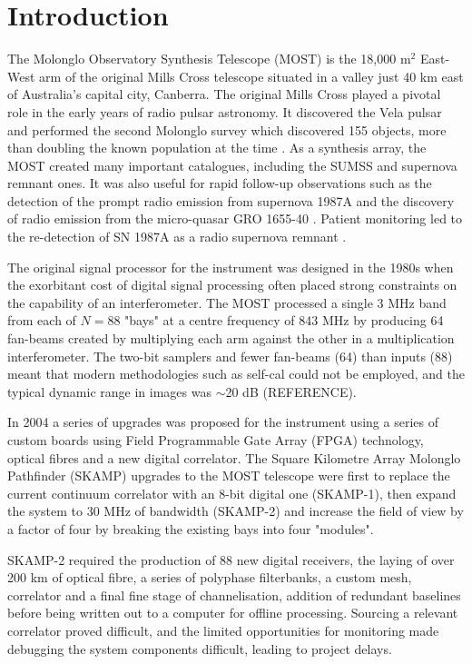 \section{Introduction} 
The Molonglo Observatory Synthesis Telescope (MOST) is the 18,000 m$^2$ East-West arm of the original Mills Cross telescope situated in a valley just 40 km east of Australia's capital city, Canberra. The original Mills Cross played a pivotal role in the early years of radio pulsar astronomy. It discovered the Vela pulsar \cite{LARGE_1968} and performed the second Molonglo survey which discovered 155 objects, more than doubling the known population at the time \cite{Manchester_1978}. As a synthesis array, the MOST created many important catalogues, including the SUMSS \cite{Bock_1999,Mauch_2003} and supernova remnant \cite{Whiteoak_1996} ones. It was also useful for rapid follow-up observations such as the detection of the prompt radio emission from supernova 1987A \cite{Turtle_1987} and the discovery of radio emission from the micro-quasar GRO 1655-40 \cite{Tingay_1995}. Patient monitoring led to the re-detection of SN 1987A as a radio supernova remnant \cite{Staveley_Smith_1992}.

The original signal processor \cite{Robertson_1991} for the instrument was designed in the 1980s when the exorbitant cost of digital signal processing often placed strong constraints on the capability of an interferometer. The MOST processed a single 3 MHz band from each of $N=88$ "bays" at a centre frequency of 843 MHz by producing 64 fan-beams created by multiplying each arm against the other in a multiplication interferometer. The two-bit samplers and fewer fan-beams (64) than inputs (88) meant that modern methodologies such as self-cal could not be employed, and the typical dynamic range in images was $\sim$20 dB (REFERENCE). 

In 2004 a series of upgrades was proposed for the instrument using a series of custom boards using Field Programmable Gate Array (FPGA) technology, optical fibres and a new digital correlator\cite{Adams_2004}. The Square Kilometre Array Molonglo Pathfinder (SKAMP) upgrades to the MOST telescope were first to replace the current continuum correlator with an 8-bit digital one (SKAMP-1), then expand the system to 30 MHz of bandwidth (SKAMP-2) and increase the field of view by a factor of four by breaking the existing bays into four "modules".

SKAMP-2 required the production of 88 new digital receivers, the laying of over 200 km of optical fibre, a series of polyphase filterbanks, a custom mesh, correlator and a final fine stage of channelisation, addition of redundant baselines before being written out to a computer for offline processing\cite{Adams_2004}. Sourcing a relevant correlator proved difficult, and the limited opportunities for monitoring made debugging the system components difficult, leading to project delays.

